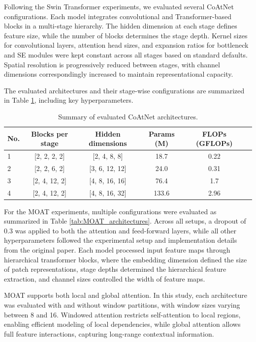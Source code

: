 \documentclass[a4paper,11pt,twoside]{report}
\theoremstyle{definition}
\begin{document}
Following the Swin Transformer experiments, we evaluated several CoAtNet configurations. Each model integrates convolutional and Transformer-based blocks in a multi-stage hierarchy. The hidden dimension at each stage defines feature size, while the number of blocks determines the stage depth. Kernel sizes for convolutional layers, attention head sizes, and expansion ratios for bottleneck and SE modules were kept constant across all stages based on standard defaults. Spatial resolution is progressively reduced between stages, with channel dimensions correspondingly increased to maintain representational capacity.

The evaluated architectures and their stage-wise configurations are summarized in Table \ref{tab:CoAtNet_architectures}, including key hyperparameters.


\begin{table}[h!]
\centering
\caption{Summary of evaluated CoAtNet architectures.}
\begin{adjustbox}{max width=\textwidth}
\begin{tabular}{lccccc}
\hline
\textbf{No.} & \textbf{Blocks per stage} & \textbf{Hidden dimensions} & \textbf{Params (M)} &
\textbf{FLOPs (GFLOPs)} \\
\hline
1 & [2, 2, 2, 2] & [2, 4, 8, 8] & 18.7 & 0.22 \\
2 & [2, 2, 6, 2] & [3, 6, 12, 12] & 24.0 & 0.31 \\
3 & [2, 4, 12, 2] & [4, 8, 16, 16] & 76.4 & 1.7 \\
4 & [2, 4, 12, 2] & [4, 8, 16, 32] & 133.6 & 2.96 \\
\hline
\end{tabular}
\label{tab:CoAtNet_architectures}
\end{adjustbox}
\end{table}

For the MOAT experiments, multiple configurations were evaluated as summarized in Table \ref{tab:MOAT_architectures}. Across all setups, a dropout of 0.3 was applied to both the attention and feed-forward layers, while all other hyperparameters followed the experimental setup and implementation details from the original paper. Each model processed input feature maps through hierarchical transformer blocks, where the embedding dimension defined the size of patch representations, stage depths determined the hierarchical feature extraction, and channel sizes controlled the width of feature maps.

MOAT supports both local and global attention. In this study, each architecture was evaluated with and without window partitions, with window sizes varying between 8 and 16. Windowed attention restricts self-attention to local regions, enabling efficient modeling of local dependencies, while global attention allows full feature interactions, capturing long-range contextual information.
\end{document}
